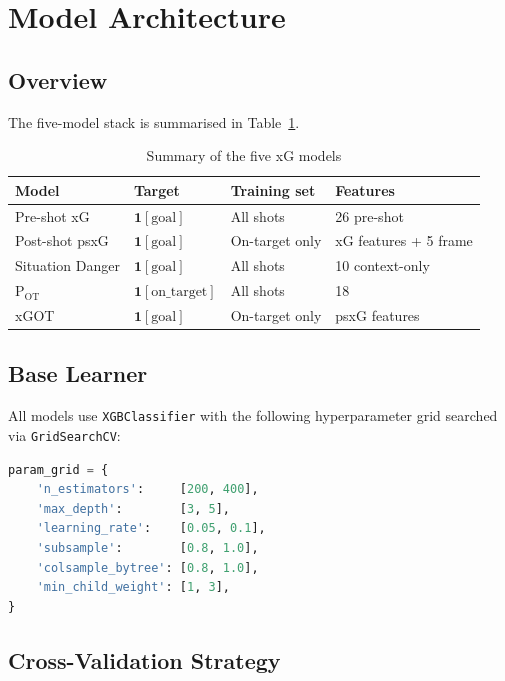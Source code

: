 \documentclass[12pt,a4paper]{article}
\begin{document}
\section{Model Architecture}
\label{sec:models}

\subsection{Overview}

The five-model stack is summarised in Table~\ref{tab:models}.

\begin{table}[H]
\centering
\caption{Summary of the five xG models}
\label{tab:models}
\begin{tabularx}{\textwidth}{lXll}
\toprule
\textbf{Model} & \textbf{Target} & \textbf{Training set} & \textbf{Features} \\
\midrule
Pre-shot xG & $\mathbf{1}[\text{goal}]$ & All shots & 26 pre-shot \\
Post-shot psxG & $\mathbf{1}[\text{goal}]$ & On-target only & xG features + 5 frame \\
Situation Danger & $\mathbf{1}[\text{goal}]$ & All shots & 10 context-only \\
P$_{\text{OT}}$ & $\mathbf{1}[\text{on\_target}]$ & All shots & 18 \\
xGOT & $\mathbf{1}[\text{goal}]$ & On-target only & psxG features \\
\bottomrule
\end{tabularx}
\end{table}

\subsection{Base Learner}

All models use \texttt{XGBClassifier} with the following hyperparameter grid searched via \texttt{GridSearchCV}:

\begin{lstlisting}[language=Python]
param_grid = {
    'n_estimators':     [200, 400],
    'max_depth':        [3, 5],
    'learning_rate':    [0.05, 0.1],
    'subsample':        [0.8, 1.0],
    'colsample_bytree': [0.8, 1.0],
    'min_child_weight': [1, 3],
}
\end{lstlisting}

\subsection{Cross-Validation Strategy}
\end{document}

